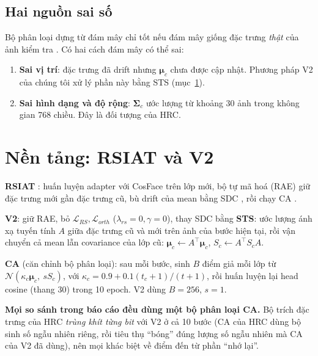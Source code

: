 \documentclass[11pt]{article}
\newcommand{\bmu}{\boldsymbol{\mu}}
\newcommand{\bSigma}{\boldsymbol{\Sigma}}
\begin{document}
\subsection{Hai nguồn sai số}
Bộ phân loại dựng từ đám mây chỉ tốt nếu đám mây giống đặc trưng \emph{thật} của ảnh kiểm tra \cite{devroye}. Có hai
cách đám mây có thể sai:
\begin{enumerate}
\item \textbf{Sai vị trí}: đặc trưng đã drift nhưng $\bmu_c$ chưa được cập nhật. Phương pháp V2 của chúng tôi xử lý
      phần này bằng STS (mục~\ref{sec:v2}).
\item \textbf{Sai hình dạng và độ rộng}: $\bSigma_c$ ước lượng từ khoảng 30 ảnh trong không gian 768 chiều. Đây là
      đối tượng của HRC.
\end{enumerate}

\section{Nền tảng: RSIAT và V2}\label{sec:v2}
\textbf{RSIAT} \cite{ssiat}: huấn luyện adapter với CosFace \cite{cosface} trên lớp mới, bộ tự mã hoá (RAE) giữ đặc
trưng mới gần đặc trưng cũ, bù drift của mean bằng SDC \cite{sdc}, rồi chạy CA \cite{slca}.

\textbf{V2}: giữ RAE, bỏ $\mathcal{L}_{RS},\mathcal{L}_{orth}$ ($\lambda_{rs}=0,\gamma=0$), thay SDC bằng \textbf{STS}:
ước lượng ánh xạ tuyến tính $A$ giữa đặc trưng cũ và mới trên ảnh của bước hiện tại, rồi vận chuyển cả mean lẫn
covariance của lớp cũ: $\bmu_c\leftarrow A^\top\bmu_c$, $S_c\leftarrow A^\top S_cA$.

\textbf{CA} (căn chỉnh bộ phân loại): sau mỗi bước, sinh $B$ điểm giả mỗi lớp từ $\mathcal{N}(\kappa_c\bmu_c,\ sS_c)$,
với $\kappa_c=0.9+0.1(t_c+1)/(t+1)$, rồi huấn luyện lại head cosine (thang 30) trong 10 epoch. V2 dùng $B=256$, $s=1$.

\textbf{Mọi so sánh trong báo cáo đều dùng một bộ phân loại CA.} Bộ trích đặc trưng của HRC \emph{trùng khít từng bit}
với V2 ở cả 10 bước (CA của HRC dùng bộ sinh số ngẫu nhiên riêng, rồi tiêu thụ ``bóng'' đúng lượng số ngẫu nhiên mà CA
của V2 đã dùng), nên mọi khác biệt về điểm đến từ phần ``nhớ lại''.

\end{document}
